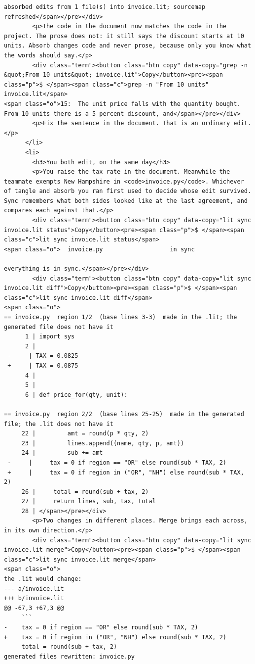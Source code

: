 \documentclass[10pt,a4paper]{article}
\begin{document}
\begin{Verbatim}
absorbed edits from 1 file(s) into invoice.lit; sourcemap refreshed</span></pre></div>
        <p>The code in the document now matches the code in the project. The prose does not: it still says the discount starts at 10 units. Absorb changes code and never prose, because only you know what the words should say.</p>
        <div class="term"><button class="btn copy" data-copy="grep -n &quot;From 10 units&quot; invoice.lit">Copy</button><pre><span class="p">$ </span><span class="c">grep -n "From 10 units" invoice.lit</span>
<span class="o">15:  The unit price falls with the quantity bought. From 10 units there is a 5 percent discount, and</span></pre></div>
        <p>Fix the sentence in the document. That is an ordinary edit.</p>
      </li>
      <li>
        <h3>You both edit, on the same day</h3>
        <p>You raise the tax rate in the document. Meanwhile the teammate exempts New Hampshire in <code>invoice.py</code>. Whichever of tangle and absorb you ran first used to decide whose edit survived. Sync remembers what both sides looked like at the last agreement, and compares each against that.</p>
        <div class="term"><button class="btn copy" data-copy="lit sync invoice.lit status">Copy</button><pre><span class="p">$ </span><span class="c">lit sync invoice.lit status</span>
<span class="o">  invoice.py                   in sync

everything is in sync.</span></pre></div>
        <div class="term"><button class="btn copy" data-copy="lit sync invoice.lit diff">Copy</button><pre><span class="p">$ </span><span class="c">lit sync invoice.lit diff</span>
<span class="o">
== invoice.py  region 1/2  (base lines 3-3)  made in the .lit; the generated file does not have it
      1 | import sys
      2 |
 -     | TAX = 0.0825
 +     | TAX = 0.0875
      4 |
      5 |
      6 | def price_for(qty, unit):

== invoice.py  region 2/2  (base lines 25-25)  made in the generated file; the .lit does not have it
     22 |         amt = round(p * qty, 2)
     23 |         lines.append((name, qty, p, amt))
     24 |         sub += amt
 -     |     tax = 0 if region == "OR" else round(sub * TAX, 2)
 +     |     tax = 0 if region in ("OR", "NH") else round(sub * TAX, 2)
     26 |     total = round(sub + tax, 2)
     27 |     return lines, sub, tax, total
     28 | </span></pre></div>
        <p>Two changes in different places. Merge brings each across, in its own direction.</p>
        <div class="term"><button class="btn copy" data-copy="lit sync invoice.lit merge">Copy</button><pre><span class="p">$ </span><span class="c">lit sync invoice.lit merge</span>
<span class="o">
the .lit would change:
--- a/invoice.lit
+++ b/invoice.lit
@@ -67,3 +67,3 @@
     ```
-    tax = 0 if region == "OR" else round(sub * TAX, 2)
+    tax = 0 if region in ("OR", "NH") else round(sub * TAX, 2)
     total = round(sub + tax, 2)
generated files rewritten: invoice.py


\end{Verbatim}
\end{document}
